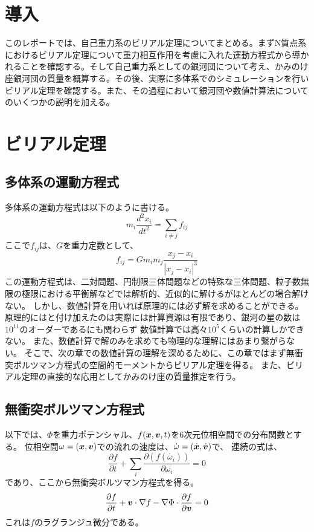 \documentclass{jsarticle}
\begin{document}
\fi
\section  {導入}
このレポートでは、自己重力系のビリアル定理についてまとめる。まずN質点系におけるビリアル定理について重力相互作用を考慮に入れた運動方程式から導かれることを確認する。そして自己重力系としての銀河団について考え、かみのけ座銀河団の質量を概算する。その後、実際に多体系でのシミュレーションを行いビリアル定理を確認する。また、その過程において銀河団や数値計算法についてのいくつかの説明を加える。
\section  {ビリアル定理}
\subsection{多体系の運動方程式}
多体系の運動方程式は以下のように書ける。
\begin{equation}
	m_i \frac{d^2x_i}{dt^2} = \sum_{i \neq j} f_{ij}
\end{equation}	
ここで$f_{ij}$は、$G$を重力定数として、
\begin{equation}
	f_{ij} = G m_i m_j \frac{x_j - x_i}{|x_j - x_i|^3}
\end{equation}	
この運動方程式は、二対問題、円制限三体問題などの特殊な三体問題、粒子数無限の極限における平衡解などでは解析的、近似的に解けるがほとんどの場合解けない。
しかし、数値計算を用いれば原理的には必ず解を求めることができる。原理的にはと付け加えたのは実際には計算資源は有限であり、銀河の星の数は$10^{11}$のオーダーであるにも関わらず
数値計算では高々$10^5$くらいの計算しかできない。
また、数値計算で解のみを求めても物理的な理解にはあまり繋がらない。
そこで、次の章での数値計算の理解を深めるために、この章ではまず無衝突ボルツマン方程式の空間的モーメントからビリアル定理を得る。
また、ビリアル定理の直接的な応用としてかみのけ座の質量推定を行う。

\subsection{無衝突ボルツマン方程式}
以下では、$\Phi$を重力ポテンシャル、$f(\bm{x}, \bm{v}, t)$を6次元位相空間での分布関数とする。
位相空間$\omega = (\bm{x}, \bm{v})$での流れの速度は、$\dot{\omega} = (\dot{\bm{x}}, \dot{\bm{v}})$で、
連続の式は、
\begin{equation}	
	\frac{\partial f}{\partial t} + \sum_i \frac{\partial (f(\dot{\omega_i}))}{\partial \omega_i} = 0
\end{equation}	
であり、ここから無衝突ボルツマン方程式を得る。
\begin{equation}	
	\label{bolzman}
	\frac{\partial f}{\partial t} + \bm{v}\cdot\nabla f - \nabla\Phi\cdot\frac{\partial f}{\partial \bm{v}}= 0
\end{equation}	
これは$f$のラグランジュ微分である。
\end{document}

